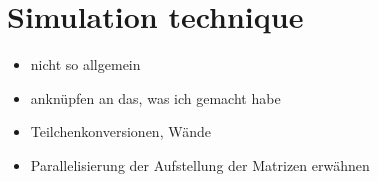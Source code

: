 \documentclass[bachelor,       %
               twoside,        %
               BCOR10mm,       %
               ngerman, english %
               ]{GAUBM}
\begin{document}


\chapter{Simulation technique}

\begin{itemize}
    \item nicht so allgemein
    \item anknüpfen an das, was ich gemacht habe
    \item Teilchenkonversionen, Wände
    \item Parallelisierung der Aufstellung der Matrizen erwähnen
\end{itemize}
\end{document}
